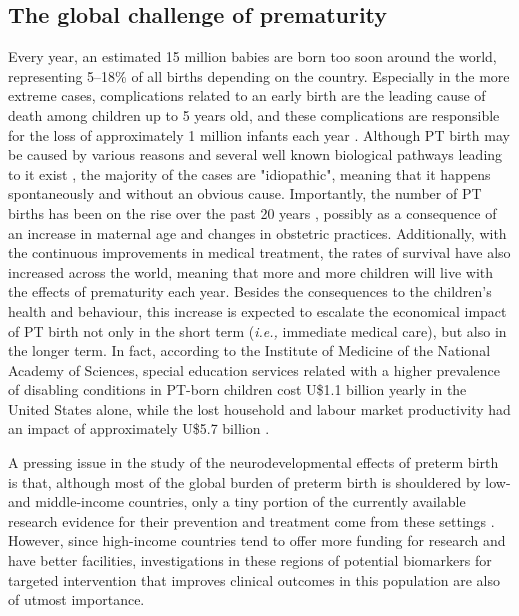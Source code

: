 \subsection{The global challenge of prematurity}

Every year, an estimated 15 million babies are born too soon around the world, representing 5–18\% of all births depending on the country. 
Especially in the more extreme cases, complications related to an early birth are the leading cause of death among children up to 5 years old, and these complications are responsible for the loss of approximately 1 million infants each year \citep{Liu2016}. 
Although PT birth may be caused by various reasons and several well known biological pathways leading to it exist \citep{Behrman2007}, the majority of the cases are "idiopathic", meaning that it happens spontaneously and without an obvious cause.
Importantly, the number of PT births has been on the rise over the past 20 years \citep{Costeloe2012}, possibly as a consequence of  an increase in maternal age and changes in obstetric practices. 
Additionally, with the continuous improvements in medical treatment, the rates of survival have also increased across the world, meaning that more and more children will live with the effects of prematurity each year. 
Besides the consequences to the children's health and behaviour, this increase is expected to escalate the economical impact of PT birth not only in the short term (\textit{i.e.,} immediate medical care), but also in the longer term. 
In fact, according to the Institute of Medicine of the National Academy of Sciences, special education services related with a higher prevalence of disabling conditions in PT-born children cost U\$1.1 billion yearly in the United States alone, while the lost household and labour market productivity had an impact of approximately U\$5.7 billion \citep{Behrman2007}. %

A pressing issue in the study of the neurodevelopmental effects of preterm birth is that, although most of the global burden of preterm birth is shouldered by low- and middle-income countries, only a tiny portion of the currently available research evidence for their prevention and treatment come from these settings \citep{Smid2016}. However, since high-income countries tend to offer more funding for research and have better facilities, investigations in these regions of potential biomarkers for targeted intervention that improves clinical outcomes in this population are also of utmost importance. 

